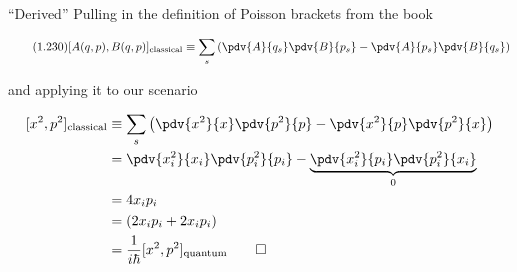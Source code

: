 \begin{answer}
\begin{answerpart}{``Derived''}
    Pulling in the definition of Poisson brackets from the book
    
    \begin{equation}
      \tag{1.230}
      [A(q,p),B(q,p)]_{\text{classical}} \equiv
      \sum_s \left(
      \pdv{A}{q_s}
      \pdv{B}{p_s}
      - 
      \pdv{A}{p_s}
      \pdv{B}{q_s}
      \right)
    \end{equation}

    and applying it to our scenario
    
    \begin{equation}
      \begin{split}
        [x^2,p^2]_{\text{classical}}
        &\equiv
        \sum_s \left(
        \pdv{x^2}{x}
        \pdv{p^2}{p}
        - 
        \pdv{x^2}{p}
        \pdv{p^2}{x}
        \right)
        \\
        &=
        \pdv{x_i^2}{x_i}
        \pdv{p_i^2}{p_i}
        -
        \underbrace{
          \pdv{x_i^2}{p_i}
          \pdv{p_i^2}{x_i}
        }_{0}
        \\
        &= 4x_ip_i
        \\
        &= (2x_ip_i + 2x_ip_i)
        \\
        &= \frac{1}{i\hbar}[x^2,p^2]_{\text{quantum}}\qed
        \\
      \end{split}
    \end{equation}

  \end{answerpart}

\end{answer}
